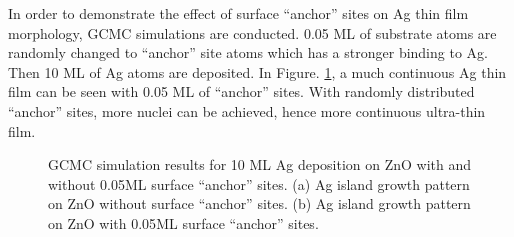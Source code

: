 In order to demonstrate the effect of surface ``anchor'' sites on Ag thin film morphology, \ac{GCMC} simulations are conducted. 0.05 \ac{ML} of substrate atoms are randomly changed to ``anchor'' site atoms which has a stronger binding to Ag. Then 10 \ac{ML} of Ag atoms are deposited. In Figure. \ref{Chap:Ag/ZnO:fig14}, a much continuous Ag thin film can be seen with 0.05 \ac{ML} of ``anchor'' sites. With randomly distributed ``anchor'' sites, more nuclei can be achieved, hence more continuous ultra-thin film.

\newpage
\begingroup
\begin{figure}[!ht]
  \centering
  \label{Chap:Ag/ZnO:fig:14a}
  \label{Chap:Ag/ZnO:fig:14b}
\caption[GCMC simulation results for 10 \ac{ML} Ag deposition on ZnO with and without 0.05\ac{ML} surface ``anchor'' sites.]{\ac{GCMC} simulation results for 10 \ac{ML} Ag deposition on ZnO with and without 0.05\ac{ML} surface ``anchor'' sites. (a) Ag island growth pattern on ZnO without surface ``anchor'' sites. (b) Ag island growth pattern on ZnO with 0.05\ac{ML} surface ``anchor'' sites.}
\label{Chap:Ag/ZnO:fig14}
\end{figure}
\endgroup